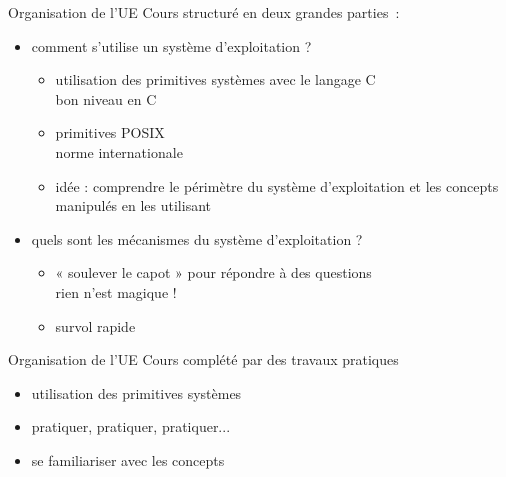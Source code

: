\def\inc{inc1-1-intro}




\begin {frame} {Organisation de l'UE}
    Cours structuré en deux grandes parties~:

    \begin {itemize}
	\item comment s'utilise un système d'exploitation ?

	    \begin {itemize}
		\item utilisation des primitives systèmes avec le
		    langage C
		    \\
		    \implique bon niveau en C

		\item primitives POSIX
		    \\
		    \implique norme internationale

		\item idée : comprendre le périmètre du système
		    d'exploitation et les concepts manipulés en
		    les utilisant

	    \end {itemize}

	\item quels sont les mécanismes du système d'exploitation ?

	    \begin {itemize}
		\item « soulever le capot » pour répondre à des
		    questions \\
		    \implique rien n'est magique !

		\item survol rapide
	    \end {itemize}
    \end {itemize}
\end {frame}

\begin {frame} {Organisation de l'UE}
    Cours complété par des travaux pratiques

    \begin {itemize}
	\item utilisation des primitives systèmes
	\item pratiquer, pratiquer, pratiquer...
	\item se familiariser avec les concepts
    \end {itemize}
\end {frame}

